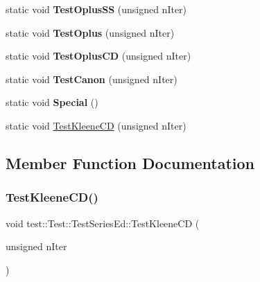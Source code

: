 \begin{DoxyCompactItemize}
\item 
\mbox{\label{classtest_1_1_test_1_1_test_series_ed_a296b3f9e489a87704e1e91cc0700f67f}} 
static void {\bfseries Test\+Oplus\+SS} (unsigned n\+Iter)
\item 
\mbox{\label{classtest_1_1_test_1_1_test_series_ed_a5b767b03ac99d0e7f3cdbbc064b8bd47}} 
static void {\bfseries Test\+Oplus} (unsigned n\+Iter)
\item 
\mbox{\label{classtest_1_1_test_1_1_test_series_ed_aa809629b85ec66275a16cd41b0cdb3e7}} 
static void {\bfseries Test\+Oplus\+CD} (unsigned n\+Iter)
\item 
\mbox{\label{classtest_1_1_test_1_1_test_series_ed_a75156495b0476fb5a2e72dcb4b2a7cf0}} 
static void {\bfseries Test\+Canon} (unsigned n\+Iter)
\item 
\mbox{\label{classtest_1_1_test_1_1_test_series_ed_afd12715c5fbcb67694c78104815bef24}} 
static void {\bfseries Special} ()
\item 
static void \mbox{\hyperlink{classtest_1_1_test_1_1_test_series_ed_aa99eeabff5668975731cc7fc2dc89cac}{Test\+Kleene\+CD}} (unsigned n\+Iter)
\end{DoxyCompactItemize}


\subsection{Member Function Documentation}
\mbox{\label{classtest_1_1_test_1_1_test_series_ed_aa99eeabff5668975731cc7fc2dc89cac}} 
\subsubsection{\texorpdfstring{Test\+Kleene\+C\+D()}{TestKleeneCD()}}
{\footnotesize\ttfamily void test\+::\+Test\+::\+Test\+Series\+Ed\+::\+Test\+Kleene\+CD (\begin{DoxyParamCaption}\item[{unsigned}]{n\+Iter }\end{DoxyParamCaption})\hspace{0.3cm}{\ttfamily [static]}}

